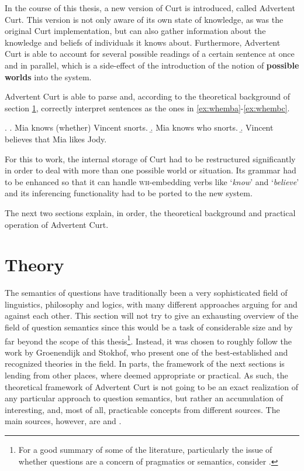 \documentclass[notitlepage,twoside,a4paper]{scrreprt}
\newcommand{\term}[1]{\textsf{\textbf{#1}}} %
\newcommand{\pn}{\textsf} %
\newcommand{\example}[1]{`\textit{#1}'} %
\newcommand{\wh}{\textsc{wh}}
\newcommand{\curt}{\pn{Curt}}
\newcommand{\acurt}{\pn{Advertent Curt}}
\theoremstyle{remark}
\theoremstyle{remark}
\theoremstyle{definition}
\theoremstyle{definition}
\begin{document}
In the course of this thesis, a new version of \curt{} is introduced, called
\acurt. This version is not only aware of its own state of knowledge, as was the
original \curt{} implementation, but can also gather information about the
knowledge and beliefs of individuals it knows about. Furthermore, \acurt{} is
able to account for several possible readings of a certain sentence at once and
in parallel, which is a side-effect of the introduction of the notion of
\term{possible worlds} into the system.

\acurt{} is able to parse and, according to the theoretical background of section
\ref{sec:theory}, correctly interpret sentences as the ones in
\ref{ex:whemba}-\ref{ex:whembc}.

\ex.
\a.  Mia knows (whether) Vincent snorts.\label{ex:whemba}
\b.  Mia knows who snorts.
\b.  Vincent believes that Mia likes Jody.\label{ex:whembc}

For this to work, the internal storage of \curt{} had to be restructured
significantly in order to deal with more than one possible world or situation.
Its grammar had to be enhanced so that it can handle \wh-embedding verbs
like \example{know} and \example{believe} and its inferencing functionality had
to be ported to the new system.

The next two sections explain, in order, the theoretical background and
practical operation of \acurt{}.

\chapter{Theory}\label{sec:theory}

The semantics of questions have traditionally been a very sophisticated field of
linguistics,  philosophy and logics, with many different approaches arguing for
and against each other. This section will not try to give an exhausting overview
of the field of question semantics since this would be a task of considerable
size and by far beyond the scope of this thesis\footnote{For a good summary of
some of the literature, particularly the issue of whether questions are a
concern of pragmatics or semantics, consider \cite[section 2 and 3]{gs:q}.}.
Instead, it was chosen to roughly follow the work by Groenendijk and Stokhof,
who present one of the best-established and recognized theories in the field.
In parts, the framework of the next sections is lending from other places, where
deemed appropriate or practical. As such, the theoretical framework of \acurt{}
is not going to be an exact realization of any particular approach to question
semantics, but rather an accumulation of interesting, and, most of all,
practicable concepts from different sources. The main sources, however, are
\cite{gs:q} and \cite{gs:sqpa}.
\end{document}
